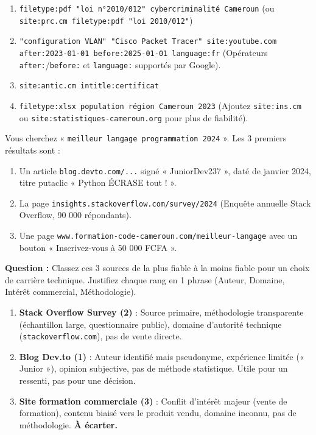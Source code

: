 \documentclass[11pt]{article}
\begin{document}
\begin{corrige}
\begin{enumerate}
    \item \texttt{filetype:pdf "loi n°2010/012" cybercriminalité Cameroun} \quad (ou \texttt{site:prc.cm filetype:pdf "loi 2010/012"})
    \item \texttt{"configuration VLAN" "Cisco Packet Tracer" site:youtube.com after:2023-01-01 before:2025-01-01 language:fr} \quad (Opérateurs \texttt{after:}/\texttt{before:} et \texttt{language:} supportés par Google).
    \item \texttt{site:antic.cm intitle:certificat}
    \item \texttt{filetype:xlsx population région Cameroun 2023} \quad (Ajoutez \texttt{site:ins.cm} ou \texttt{site:statistiques-cameroun.org} pour plus de fiabilité).
\end{enumerate}
\end{corrige}

\begin{exercice}
Vous cherchez « \texttt{meilleur langage programmation 2024} ». Les 3 premiers résultats sont :
\begin{enumerate}
    \item Un article \texttt{blog.devto.com/...} signé « JuniorDev237 », daté de janvier 2024, titre putaclic « Python ÉCRASE tout ! ».
    \item La page \texttt{insights.stackoverflow.com/survey/2024} (Enquête annuelle Stack Overflow, 90 000 répondants).
    \item Une page \texttt{www.formation-code-cameroun.com/meilleur-langage} avec un bouton « Inscrivez-vous à 50 000 FCFA ».
\end{enumerate}
\textbf{Question :} Classez ces 3 sources de la plus fiable à la moins fiable pour un choix de carrière technique. Justifiez chaque rang en 1 phrase (Auteur, Domaine, Intérêt commercial, Méthodologie).
\end{exercice}

\begin{corrige}
\begin{enumerate}
    \item \textbf{Stack Overflow Survey (2)} : Source primaire, méthodologie transparente (échantillon large, questionnaire public), domaine d'autorité technique (\texttt{stackoverflow.com}), pas de vente directe.
    \item \textbf{Blog Dev.to (1)} : Auteur identifié mais pseudonyme, expérience limitée (« Junior »), opinion subjective, pas de méthode statistique. Utile pour un ressenti, pas pour une décision.
    \item \textbf{Site formation commerciale (3)} : Conflit d'intérêt majeur (vente de formation), contenu biaisé vers le produit vendu, domaine inconnu, pas de méthodologie. \textbf{À écarter.}
\end{enumerate}
\end{corrige}
\end{document}
